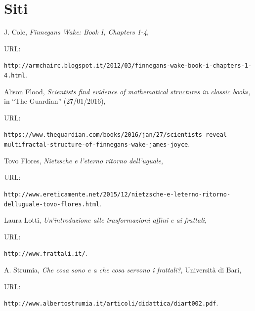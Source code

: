 \documentclass[10pt]{report}
\begin{document}
			\section{Siti}
				\begin{enumerate}[label={[\arabic*]}]
					\item J. Cole, \textit{Finnegans Wake: Book I, Chapters 1-4}, 
					\begin{small}
						URL:
					\end{small} \texttt{http://armchairc.blogspot.it/2012/03/finnegans-wake-book-i-chapters-1-4.html}.
					\item Alison Flood, \textit{Scientists find evidence of mathematical structures in classic books}, in ``The Guardian'' (27/01/2016), 
					\begin{small}
						URL:
					\end{small}
					 \texttt{https://www.theguardian.com/books/2016/jan/27/scientists-reveal-multifractal-structure-of-finnegans-wake-james-joyce}.

					\item Tovo Flores, \textit{Nietzsche e l'eterno ritorno dell'uguale},
					\begin{small}
						URL:
					\end{small}
					\texttt{http://www.ereticamente.net/2015/12/nietzsche-e-leterno-ritorno-delluguale-tovo-flores.html}.
					\item Laura Lotti, \textit{Un'introduzione alle trasformazioni affini e ai frattali},
					\begin{small}
						URL:
					\end{small}
					\texttt{http://www.frattali.it/}.
					\item A. Strumia, \textit{Che cosa sono e a che cosa servono i frattali?}, Università di Bari, \\
					\begin{small}
						URL:
					\end{small}
					\texttt{http://www.albertostrumia.it/articoli/didattica/diart002.pdf}.
				\end{enumerate}
\end{document}
